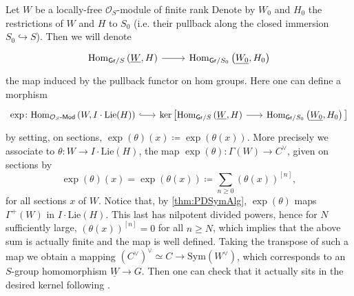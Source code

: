 \begin{defn}
	Let $W$ be a locally-free $\mathcal{O}_{ S }$-module of finite rank
	Denote by $W_0$ and $H_0$ the restrictions of $W$ and $H$ to 
	$S_0$ (i.e. their pullback along
	the closed immersion $S_0 \hookrightarrow S$).
	Then we will denote
	\begin{equation*}
	\begin{tikzcd}[row sep = 0ex
		,/tikz/column 1/.append style={anchor=base east}
		,/tikz/column 2/.append style={anchor=base west}]
		\mathrm{Hom}_{ \mathsf{Gr}/S } 
		\left( \underline{W}, H \right)
		\arrow[r, "", rightarrow] &
		\mathrm{Hom}_{ \mathsf{Gr}/S_0 }
		\left( \underline{W_0}, H_0 \right)
	\end{tikzcd}
	\end{equation*} 
	the map induced by the pullback functor on hom groups.
	Here one can define a morphism
	\begin{equation*}
	\begin{tikzcd}[row sep = 0ex, column sep = 1.8em
		,/tikz/column 1/.append style={anchor=base east}
		,/tikz/column 2/.append style={anchor=base west}]
		\exp\colon
		\mathrm{Hom}_{ \mathcal{O}_{ S }\text{-}\mathsf{Mod} }
		\left( W, I \cdot \mathrm{Lie}(H) \right)
		\arrow[r, "", hookrightarrow] &
		\ker \big[ 
		\mathrm{Hom}_{ \mathsf{Gr}/S } 
		\left( \underline{W}, H \right)
		\arrow[r, "", rightarrow] &
		\mathrm{Hom}_{ \mathsf{Gr}/S_0 }
		\left( \underline{W_0}, H_0 \right)
		\big]
	\end{tikzcd}
	\end{equation*} 
	by setting, on sections,
	$\exp (\theta) (x) \coloneqq \exp \left( \theta(x) \right)$.
	More precisely we associate to $\theta\colon W \to I \cdot \mathrm{Lie}(H)$,
	the map $\exp (\theta)\colon \Gamma(W) \to C^\vee$, given on sections by
	\begin{equation*}
		\exp (\theta) (x) =
	\exp \left( \theta(x) \right) \coloneqq
	\sum_{n\geq 0 } (\theta(x))^{[n]}
	,\end{equation*}
	for all sections $x$ of $W$.
	Notice that, by \cref{thm:PDSymAlg}, $\exp (\theta)$
	maps $\Gamma^+(W)$ in $I \cdot \mathrm{Lie}(H)$.
	This last has nilpotent divided powers, hence for $N$ sufficiently
	large, $(\theta(x))^{[n]} = 0$ for all $n \geq N$,
	which implies that the above sum is actually finite
	and the map is well defined.
	Taking the transpose of such a map we obtain a mapping 
	$(C^\vee)^\vee \simeq C \to \mathrm{Sym}(W^\vee)$, which corresponds
	to an $S$-group homomorphism $\underline{W} \to G$.
	Then one can check that it actually sits in the desired kernel
	following \cite[Chapter III, \S2.4, \S2.6]{Messing}.
\end{defn}




